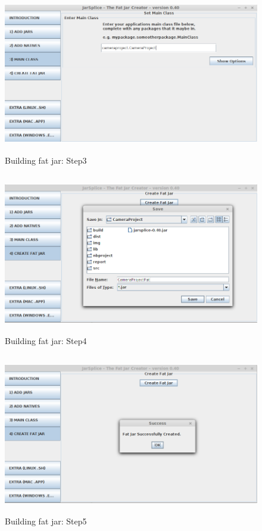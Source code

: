 \documentclass[english,12pt,a4paper,pdftex,elec,utf8]{aaltothesis}
\begin{document}
\begin{figure}[htb]
\centering \includegraphics[height=7cm]{jarSplice3.png}
\caption{Building fat jar: Step3\label{jarSplice3}}
\end{figure}

\begin{figure}[htb]
\centering \includegraphics[height=7cm]{jarSplice4.png}
\caption{Building fat jar: Step4\label{jarSplice4}}
\end{figure}

\begin{figure}[htb]
\centering \includegraphics[height=7cm]{jarSplice5.png}
\caption{Building fat jar: Step5\label{jarSplice5}}
\end{figure}
\end{document}
